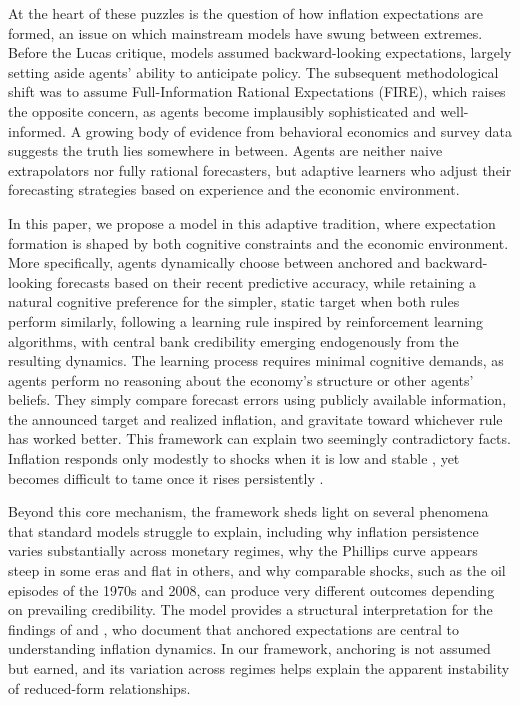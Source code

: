 \documentclass[10pt]{article}
\begin{document}
At the heart of these puzzles is the question of how inflation expectations are formed, an issue on which mainstream models have swung between extremes. Before the Lucas critique, models assumed backward-looking expectations, largely setting aside agents' ability to anticipate policy. The subsequent methodological shift was to assume Full-Information Rational Expectations (FIRE), which raises the opposite concern, as agents become implausibly sophisticated and well-informed. A growing body of evidence from behavioral economics and survey data suggests the truth lies somewhere in between. Agents are neither naive extrapolators nor fully rational forecasters, but adaptive learners who adjust their forecasting strategies based on experience and the economic environment.

In this paper, we propose a model in this adaptive tradition, where expectation formation is shaped by both cognitive constraints and the economic environment. More specifically, agents dynamically choose between anchored and backward-looking forecasts based on their recent predictive accuracy, while retaining a natural cognitive preference for the simpler, static target when both rules perform similarly, following a learning rule inspired by reinforcement learning algorithms, with central bank credibility emerging endogenously from the resulting dynamics. The learning process requires minimal cognitive demands, as agents perform no reasoning about the economy's structure or other agents' beliefs. They simply compare forecast errors using publicly available information, the announced target and realized inflation, and gravitate toward whichever rule has worked better. This framework can explain two seemingly contradictory facts. Inflation responds only modestly to shocks when it is low and stable \citep{coibion2015, ball2011}, yet becomes difficult to tame once it rises persistently \citep{erceg2003imperfect, goodfriend2005}.

Beyond this core mechanism, the framework sheds light on several phenomena that standard models struggle to explain, including why inflation persistence varies substantially across monetary regimes, why the Phillips curve appears steep in some eras and flat in others, and why comparable shocks, such as the oil episodes of the 1970s and 2008, can produce very different outcomes depending on prevailing credibility. The model provides a structural interpretation for the findings of \citet{hazell2022slope} and \citet{coibion2015}, who document that anchored expectations are central to understanding inflation dynamics. In our framework, anchoring is not assumed but earned, and its variation across regimes helps explain the apparent instability of reduced-form relationships.
\end{document}
